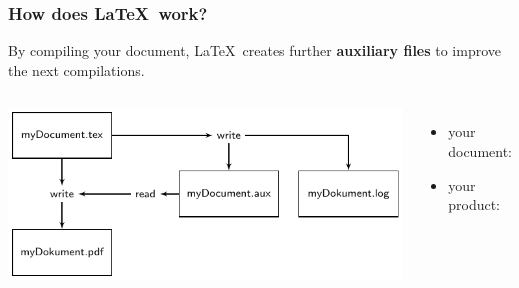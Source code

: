 \begin{frame}
\frametitle{How does \LaTeX\ work?}

By compiling your document, \LaTeX\ creates further \textbf{auxiliary files} to improve the next compilations.

\begin{columns}


\includegraphics[scale=.75]{../../texfiles-beamer/tex-material/WissArb-latex/LaTeX-flowchart-1.pdf}


\begin{itemize}
	\item your document: 
	\item your product: 
\end{itemize}

\end{columns}

\end{frame}


